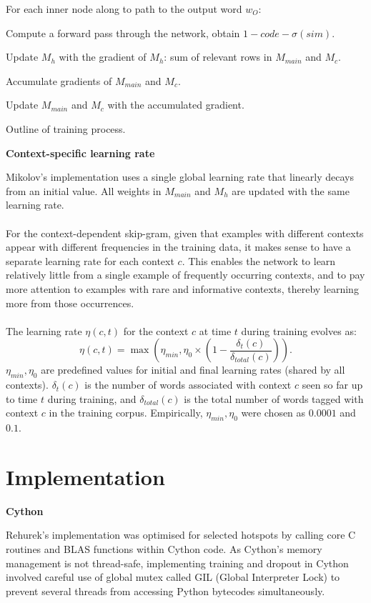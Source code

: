 \documentclass[a4paper,12pt,twoside,openright]{report}
\newcommand{\tb}{\vspace{10pt} \textbf}
\newcommand{\nl}{\\ \\}
\begin{document}
\vspace{5pt}
\begin{algorithm}[htbp]
\begin{description}
	\item For each inner node along to path to the output word $w_O$:
		\item \quad Compute a forward pass through the network, obtain $1-code-\sigma(sim).$
		\item \quad Update $M_{h}$ with the gradient of $M_h$: sum of relevant rows in $M_{main}$ and $M_c$.
		\item \quad Accumulate gradients of $M_{main}$ and $M_c$.		
	\item Update $M_{main}$ and $M_c$ with the accumulated gradient.
\end{description}
\caption{Outline of training process.}
\label{alg:chap4:backprop}
\end{algorithm}

\tb{Context-specific learning rate}

Mikolov's implementation uses a single global learning rate that linearly decays from an initial value. All weights in $M_{main}$ and $M_h$ are updated with the same learning rate. 
\nl
For the context-dependent skip-gram, given that examples with different contexts appear with different frequencies in the training data, it makes sense to have a separate learning rate for each context $c$. This enables the network to learn relatively little from a single example of frequently occurring contexts, and to pay more attention to examples with rare and informative contexts, thereby learning more from those occurrences.
\nl
The learning rate $\eta(c,t)$ for the context $c$ at time $t$ during training evolves as:
$$ \eta(c,t) = \max(\eta_{min}, \eta_0 \times(1-\frac{\delta_t(c)}{\delta_{total}(c)})).$$
$\eta_{min}, \eta_0$ are predefined values for initial and final learning rates (shared by all contexts). $\delta_t(c)$ is the number of words associated with context $c$ seen so far up to time $t$ during training, and $\delta_{total}(c)$ is the total number of words tagged with context $c$ in the training corpus. Empirically, $\eta_{min}, \eta_0$ were chosen as $0.0001$ and $0.1$.

\section{Implementation}

\tb{Cython}

Rehurek's implementation was optimised for selected hotspots by calling core C routines and BLAS functions within Cython code. As Cython's memory management is not thread-safe, implementing training and dropout in Cython involved careful use of global mutex called GIL (Global Interpreter Lock) to prevent several threads from accessing Python bytecodes simultaneously.
\end{document}
